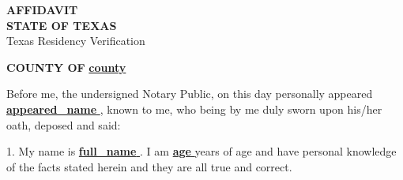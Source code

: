 \documentclass[12pt]{article}
\begin{document}
\begin{center}
    {\Large \textbf{AFFIDAVIT}}\\
    \textbf{STATE OF TEXAS}\\
    \small Texas Residency Verification
\end{center}

\vspace{1em}

\noindent \textbf{COUNTY OF} \underline{\textbf{{{{ county }}}}}

\vspace{1em}

Before me, the undersigned Notary Public, on this day personally appeared
\underline{\textbf{{{{ appeared_name }}}}}, known to me, who being by me duly sworn upon his/her oath, deposed and said:

\vspace{1em}

1. My name is \underline{\textbf{{{{ full_name }}}}}. I am \underline{\textbf{{{{ age }}}}} years of age and have personal knowledge of the facts stated herein and they are all true and correct.

\vspace{1em}
\end{document}
